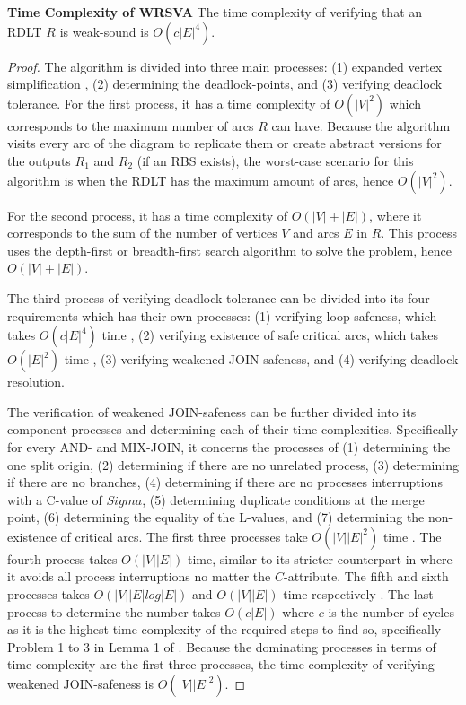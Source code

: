 \begin{thm}\textbf{Time Complexity of WRSVA}
    The time complexity of verifying that an RDLT $ R $ is weak-sound is $ O(c|E|^4) $.
    \label{TCWRSVA}
\end{thm}
\begin{proof}
    The algorithm is divided into three main processes: (1) expanded vertex simplification \cite{MalinaoWCTP2023}, (2) determining the deadlock-points, and (3) verifying deadlock tolerance. For the first process, it has a time complexity of $ O(|V|^2)$ which corresponds to the maximum number of arcs $ R $ can have. Because the algorithm visits every arc of the diagram to replicate them or create abstract versions for the outputs $ R_1 $ and $ R_2 $ (if an RBS exists), the worst-case scenario for this algorithm is when the RDLT has the maximum amount of arcs, hence $ O(|V|^2) $. 
    
    For the second process, it has a time complexity of $ O(|V|+|E|)$, where it corresponds to the sum of the number of vertices $ V $ and arcs $ E $ in $ R $. This process uses the depth-first or breadth-first search algorithm to solve the problem, hence $ O(|V|+|E|) $.

    The third process of verifying deadlock tolerance can be divided into its four requirements which has their own processes: (1) verifying loop-safeness, which takes $ O(c|E|^4) $ time \cite{MalinaoPJS2023}, (2) verifying existence of safe critical arcs, which takes $ O(|E|^2) $ time \cite{MalinaoPJS2023}, (3) verifying weakened JOIN-safeness, and (4) verifying deadlock resolution.
    
    The verification of weakened JOIN-safeness can be further divided into its component processes and determining each of their time complexities. Specifically for every AND- and MIX-JOIN, it concerns the processes of (1) determining the one split origin, (2) determining if there are no unrelated process, (3) determining if there are no branches, (4) determining if there are no processes interruptions with a C-value of $ Sigma $, (5) determining duplicate conditions at the merge point, (6) determining the equality of the L-values, and (7) determining the non-existence of critical arcs. The first three processes take $ O(|V||E|^2) $ time \cite{MalinaoPJS2023}. The fourth process takes $ O(|V||E|) $ time, similar to its stricter counterpart in \cite{MalinaoPJS2023} where it avoids all process interruptions no matter the $ C $-attribute. The fifth and sixth processes takes $ O(|V||E|log|E|) $ and $ O(|V||E|) $ time respectively \cite{MalinaoPJS2023}. The last process to determine the number takes $ O(c|E|) $ where $ c $ is the number of cycles as it is the highest time complexity of the required steps to find so, specifically Problem 1 to 3 in Lemma 1 of \cite{Malinao2017}. Because the dominating processes in terms of time complexity are the first three processes, the time complexity of verifying weakened JOIN-safeness is $ O(|V||E|^2) $.


\end{proof}
